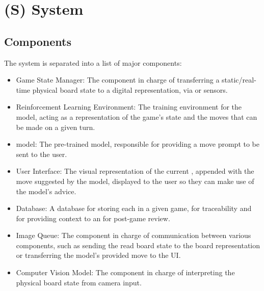 \documentclass{article}
\begin{document}
    
    
\newpage{}




\section*{(S) System}\label{sec:srs-system}
\renewcommand{\thesubsection}{S.\arabic{subsection}}
\setcounter{subsection}{0}

\subsection{Components}\label{subsec:components}
The system is separated into a list of major components:

\begin{itemize}
    \item Game State Manager: The component
    in charge of transferring a static/real-time physical board state to a 
    digital representation, via \CV{} or sensors.

    \item Reinforcement Learning Environment: The training
    environment for the model, acting as a representation of the game's state and the
    moves that can be made on a given turn.

    \item \AI{} model: The pre-trained model,
    responsible for providing a move prompt to be sent to the user.

    \item User Interface: The visual
    representation of the current \GameState{}, appended with the move suggested by
    the model, displayed to the user so they can make use of the model's advice.

    \item \GameState{} Database: A database for
    storing each \GameState{} in a given game, for traceability and for providing
    context to an \LLM{} for post-game review.

    \item Image Queue: The component
    in charge of communication between various components, such as sending the read
    board state to the board representation or transferring the model's provided
    move to the UI\@.

    \item Computer Vision Model: The component
    in charge of interpreting the physical board state from camera input.
\end{itemize}
\end{document}
